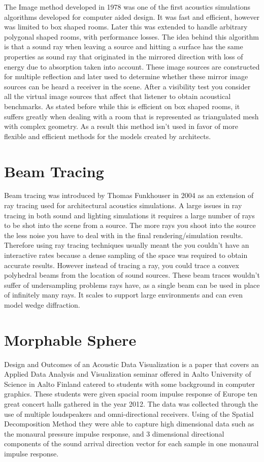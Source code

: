 \documentclass{thesis}
\begin{document}
The Image method developed in 1978 was one of the first acoustics simulations algorithms developed for computer aided design\cite{Allen1979}. It was fast and efficient, however was limited to box shaped rooms. Later this was extended to handle arbitrary polygonal shaped rooms, with performance losses. The idea behind this algorithm is that a sound ray when leaving a source and hitting a surface has the same properties as sound ray that originated in the mirrored direction with loss of energy due to absorption taken into account. These image sources are constructed for multiple reflection and later used to determine whether these mirror image sources can be heard a receiver in the scene. After a visibility test you consider all the virtual image sources that affect that listener to obtain acoustical benchmarks. As stated before while this is efficient on box shaped rooms, it suffers greatly when dealing with a room that is represented as triangulated mesh with complex geometry. As a result this method isn’t used in favor of more flexible and efficient methods for the models created by architects. 


\section{Beam Tracing}

Beam tracing\cite{Funkhouser2004} was introduced by Thomas Funkhouser in 2004 as an extension of ray tracing used for architectural acoustics simulations.  A large issues in ray tracing in both sound and lighting simulations it requires a large number of rays to be shot into the scene from a source. The more rays you shoot into the source the less noise you have to deal with in the final rendering/simulation results. Therefore using ray tracing techniques usually meant the you couldn’t have an interactive rates because a dense sampling of the space was required to obtain accurate results. However instead of tracing a ray, you could trace a convex polyhedral beams from the location of sound sources. These beam traces wouldn’t suffer of undersampling problems rays have, as a single beam can be used in place of infinitely many rays. It scales to support large environments and can even model wedge diffraction.


\section{Morphable Sphere}

Design and Outcomes of an Acoustic Data Visualization\cite{Rob} is a paper that covers an Applied Data Analysis and Visualization seminar offered in Aalto University of Science in Aalto Finland catered to students with some background in computer graphics.  These students were given  spacial room impulse response of Europe ten great concert halls gathered in the year 2012. The data was collected through the use of multiple loudspeakers and omni-directional receivers. Using of the Spatial Decomposition Method they were able to capture high dimensional data such as the monaural pressure impulse response, and 3 dimensional directional components of the sound arrival direction vector for each sample in one monaural impulse response.
\end{document}

